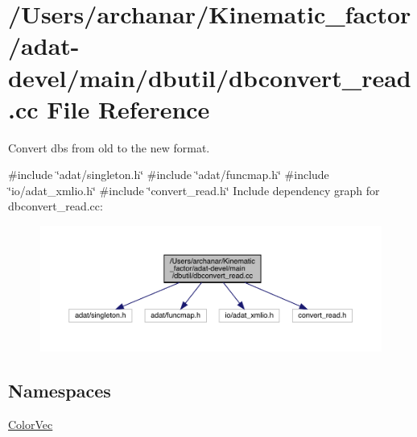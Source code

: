 \hypertarget{adat-devel_2main_2dbutil_2dbconvert__read_8cc}{}\section{/\+Users/archanar/\+Kinematic\+\_\+factor/adat-\/devel/main/dbutil/dbconvert\+\_\+read.cc File Reference}
\label{adat-devel_2main_2dbutil_2dbconvert__read_8cc}


Convert dbs from old to the new format.  


{\ttfamily \#include \char`\"{}adat/singleton.\+h\char`\"{}}\newline
{\ttfamily \#include \char`\"{}adat/funcmap.\+h\char`\"{}}\newline
{\ttfamily \#include \char`\"{}io/adat\+\_\+xmlio.\+h\char`\"{}}\newline
{\ttfamily \#include \char`\"{}convert\+\_\+read.\+h\char`\"{}}\newline
Include dependency graph for dbconvert\+\_\+read.\+cc\+:
\nopagebreak
\begin{figure}[H]
\begin{center}
\leavevmode
\includegraphics[width=350pt]{d3/d5e/adat-devel_2main_2dbutil_2dbconvert__read_8cc__incl}
\end{center}
\end{figure}
\subsection*{Namespaces}
\begin{DoxyCompactItemize}
\item 
 \mbox{\hyperlink{namespaceColorVec}{Color\+Vec}}
\end{DoxyCompactItemize}
